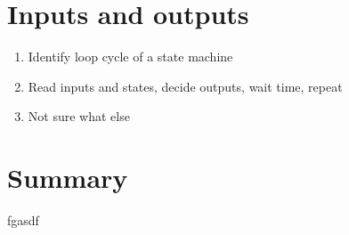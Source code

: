 \documentclass[a4paper,10pt]{article}
\begin{document}
\section{Inputs and outputs}
\begin{enumerate}
\item Identify loop cycle of a state machine
\item Read inputs and states, decide outputs, wait time, repeat
\item Not sure what else
\end{enumerate}

\section{Summary}
fgasdf
\end{document}
